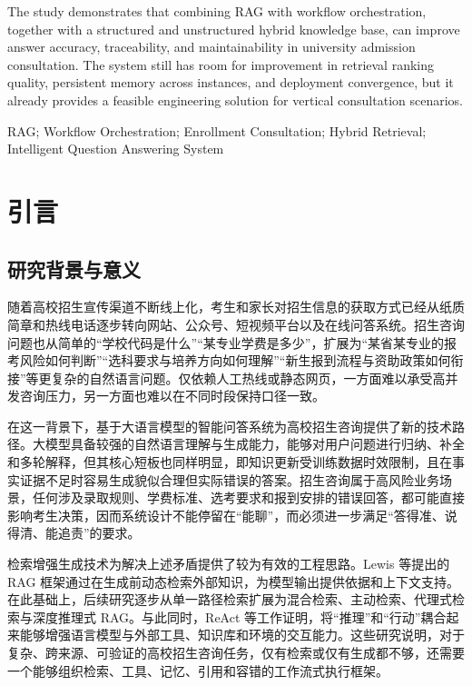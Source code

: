 \documentclass[UTF8,zihao=-4,oneside,fontset=windows]{ctexbook}
\numberwithin{equation}{chapter}
\begin{document}
The study demonstrates that combining RAG with workflow orchestration, together with a structured and unstructured hybrid knowledge base, can improve answer accuracy, traceability, and maintainability in university admission consultation. The system still has room for improvement in retrieval ranking quality, persistent memory across instances, and deployment convergence, but it already provides a feasible engineering solution for vertical consultation scenarios.

\vspace{0.8em}
RAG; Workflow Orchestration; Enrollment Consultation; Hybrid Retrieval; Intelligent Question Answering System

\clearpage
\tableofcontents

\clearpage
{}
\setcounter{page}{1}
\pagestyle{thesismain}

\chapter{引言}

\section{研究背景与意义}
随着高校招生宣传渠道不断线上化，考生和家长对招生信息的获取方式已经从纸质简章和热线电话逐步转向网站、公众号、短视频平台以及在线问答系统。招生咨询问题也从简单的“学校代码是什么”“某专业学费是多少”，扩展为“某省某专业的报考风险如何判断”“选科要求与培养方向如何理解”“新生报到流程与资助政策如何衔接”等更复杂的自然语言问题。仅依赖人工热线或静态网页，一方面难以承受高并发咨询压力，另一方面也难以在不同时段保持口径一致。

在这一背景下，基于大语言模型的智能问答系统为高校招生咨询提供了新的技术路径。大模型具备较强的自然语言理解与生成能力，能够对用户问题进行归纳、补全和多轮解释，但其核心短板也同样明显，即知识更新受训练数据时效限制，且在事实证据不足时容易生成貌似合理但实际错误的答案。招生咨询属于高风险业务场景，任何涉及录取规则、学费标准、选考要求和报到安排的错误回答，都可能直接影响考生决策，因而系统设计不能停留在“能聊”，而必须进一步满足“答得准、说得清、能追责”的要求。

检索增强生成技术为解决上述矛盾提供了较为有效的工程思路。Lewis 等提出的 RAG 框架通过在生成前动态检索外部知识，为模型输出提供依据和上下文支持\cite{lewis2020rag}。在此基础上，后续研究逐步从单一路径检索扩展为混合检索、主动检索、代理式检索与深度推理式 RAG\cite{gao2023survey,searcho1,agenticrag}。与此同时，ReAct 等工作证明，将“推理”和“行动”耦合起来能够增强语言模型与外部工具、知识库和环境的交互能力\cite{react2023}。这些研究说明，对于复杂、跨来源、可验证的高校招生咨询任务，仅有检索或仅有生成都不够，还需要一个能够组织检索、工具、记忆、引用和容错的工作流式执行框架。
\end{document}
